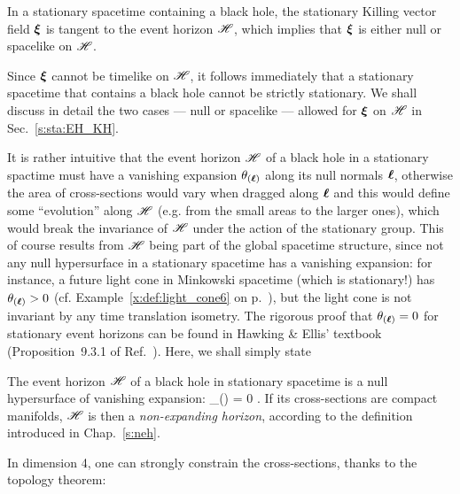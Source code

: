 \begin{prop}
\label{p:sta:xi_tangent_H}
In a stationary spacetime containing a black hole,
the stationary Killing vector field  $\bm{\xi}$ is tangent to the event horizon
$\mathscr{H}$, which implies that $\bm{\xi}$ is either null or spacelike on $\mathscr{H}$.
\end{prop}

Since $\bm{\xi}$ cannot be timelike on $\mathscr{H}$, it follows immediately
that a stationary spacetime that contains a black hole cannot be strictly stationary.
We shall discuss in detail the two cases --- null or spacelike --- allowed
for $\bm{\xi}$ on $\mathscr{H}$ in Sec.~\ref{s:sta:EH_KH}.

It is rather intuitive that the event horizon $\mathscr{H}$ of a black hole in
a stationary spactime must have a vanishing expansion $\theta_{(\bm{\ell})}$ along its null
normals $\bm{\ell}$, otherwise the area of cross-sections would vary when dragged
along $\bm{\ell}$ and this would define some ``evolution'' along $\mathscr{H}$ (e.g. from the small areas
to the larger ones),
which would break the invariance of $\mathscr{H}$ under the action of the stationary group.
This of course results from $\mathscr{H}$ being part of the global spacetime structure,
since not any null hypersurface in a stationary spacetime has a vanishing
expansion: for instance, a future light cone in Minkowski spacetime
(which is stationary!) has $\theta_{(\bm{\ell})}>0$
(cf. Example~\ref{x:def:light_cone6} on p.~\pageref{x:def:light_cone6}),
but the light cone is not invariant by any time translation isometry.
The rigorous proof that $\theta_{(\bm{\ell})} = 0$
for stationary event horizons can be found in Hawking \& Ellis' textbook
(Proposition~9.3.1 of Ref.~\cite{HawkiE73}).
Here, we shall simply state
\begin{prop}
\label{p:sta:hor_non_exanding}
The event horizon $\mathscr{H}$ of a black hole in stationary spacetime
is a null hypersurface of vanishing expansion:
\be
    \theta_{(\wl)} = 0 .
\ee
If its cross-sections are compact manifolds, $\mathscr{H}$ is then a \emph{non-expanding horizon},
according to the definition introduced in Chap.~\ref{s:neh}.
\end{prop}

In dimension 4, one can strongly constrain the cross-sections, thanks to the
topology theorem:

